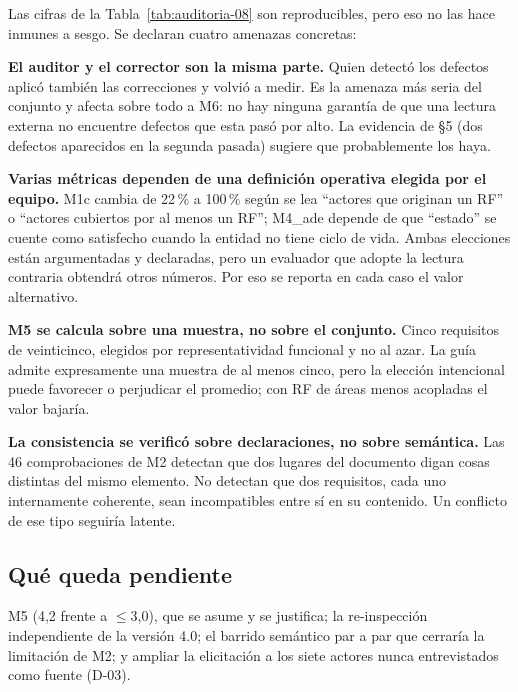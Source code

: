 Las cifras de la Tabla~\ref{tab:auditoria-08} son reproducibles, pero eso no las hace inmunes a sesgo. Se declaran cuatro amenazas concretas:

\textbf{El auditor y el corrector son la misma parte.} Quien detect\'o los defectos aplic\'o tambi\'en las correcciones y volvi\'o a medir. Es la amenaza m\'as seria del conjunto y afecta sobre todo a M6: no hay ninguna garant\'ia de que una lectura externa no encuentre defectos que esta pas\'o por alto. La evidencia de \S5 (dos defectos aparecidos en la segunda pasada) sugiere que probablemente los haya.

\textbf{Varias m\'etricas dependen de una definici\'on operativa elegida por el equipo.} M1c cambia de 22\,\% a 100\,\% seg\'un se lea ``actores que originan un RF'' o ``actores cubiertos por al menos un RF''; M4\_ade depende de que ``estado'' se cuente como satisfecho cuando la entidad no tiene ciclo de vida. Ambas elecciones est\'an argumentadas y declaradas, pero un evaluador que adopte la lectura contraria obtendr\'a otros n\'umeros. Por eso se reporta en cada caso el valor alternativo.

\textbf{M5 se calcula sobre una muestra, no sobre el conjunto.} Cinco requisitos de veinticinco, elegidos por representatividad funcional y no al azar. La gu\'ia admite expresamente una muestra de al menos cinco, pero la elecci\'on intencional puede favorecer o perjudicar el promedio; con RF de \'areas menos acopladas el valor bajar\'ia.

\textbf{La consistencia se verific\'o sobre declaraciones, no sobre sem\'antica.} Las 46 comprobaciones de M2 detectan que dos lugares del documento digan cosas distintas del mismo elemento. No detectan que dos requisitos, cada uno internamente coherente, sean incompatibles entre s\'i en su contenido. Un conflicto de ese tipo seguir\'ia latente.

\subsection{Qu\'e queda pendiente}

M5 (4,2 frente a $\leq$3,0), que se asume y se justifica; la re-inspecci\'on independiente de la versi\'on 4.0; el barrido sem\'antico par a par que cerrar\'ia la limitaci\'on de M2; y ampliar la elicitaci\'on a los siete actores nunca entrevistados como fuente (D-03).
